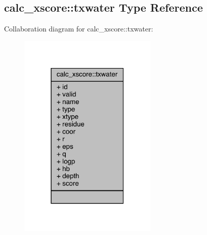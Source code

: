 \hypertarget{structcalc__xscore_1_1txwater}{\subsection{calc\-\_\-xscore\-:\-:txwater Type Reference}
\label{structcalc__xscore_1_1txwater}
}


Collaboration diagram for calc\-\_\-xscore\-:\-:txwater\-:
\nopagebreak
\begin{figure}[H]
\begin{center}
\leavevmode
\includegraphics[width=187pt]{structcalc__xscore_1_1txwater__coll__graph}
\end{center}
\end{figure}
